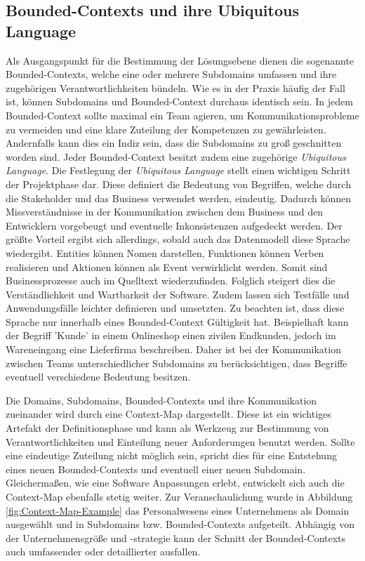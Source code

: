 \subsection{Bounded-Contexts und ihre Ubiquitous Language}

Als Ausgangspunkt für die Bestimmung der Lösungsebene dienen die sogenannte Bounded-Contexts, welche eine oder mehrere Subdomains umfassen und ihre zugehörigen Verantwortlichkeiten bündeln. Wie es in der Praxis häufig der Fall ist, können Subdomains und Bounded-Context durchaus identisch sein. In jedem Bounded-Context sollte maximal ein Team agieren, um Kommunikationsprobleme zu vermeiden und eine klare Zuteilung der Kompetenzen zu gewährleisten. Andernfalls kann dies ein Indiz sein, dass die Subdomains zu groß geschnitten worden sind. Jeder Bounded-Context besitzt zudem eine zugehörige \emph{Ubiquitous Language}. Die Festlegung der \emph{Ubiquitous Language} stellt einen wichtigen Schritt der Projektphase dar. Diese definiert die Bedeutung von Begriffen, welche durch die Stakeholder und das Business verwendet werden, eindeutig. Dadurch können Missverständnisse in der Kommunikation zwischen dem Business und den Entwicklern vorgebeugt und eventuelle Inkonsistenzen aufgedeckt werden. Der größte Vorteil ergibt sich allerdings, sobald auch das Datenmodell diese Sprache wiedergibt. Entities können Nomen darstellen, Funktionen können Verben realisieren und Aktionen können als Event verwirklicht werden. Somit sind Businessprozesse auch im Quelltext wiederzufinden. Folglich steigert dies die Verständlichkeit und Wartbarkeit der Software. Zudem lassen sich Testfälle und Anwendungsfälle leichter definieren und umsetzten. Zu beachten ist, dass diese Sprache nur innerhalb eines Bounded-Context Gültigkeit hat. Beispielhaft kann der Begriff 'Kunde' in einem Onlineshop einen zivilen Endkunden, jedoch im Wareneingang eine Lieferfirma beschreiben. Daher ist bei der Kommunikation zwischen Teams unterschiedlicher Subdomains zu berücksichtigen, dass Begriffe eventuell verschiedene Bedeutung besitzen. 

Die Domains, Subdomains, Bounded-Contexts und ihre Kommunikation zueinander wird durch eine Context-Map dargestellt. Diese ist ein wichtiges Artefakt der Definitionsphase und kann als Werkzeug zur Bestimmung von Verantwortlichkeiten und Einteilung neuer Anforderungen benutzt werden. Sollte eine eindeutige Zuteilung nicht möglich sein, spricht dies für eine Entstehung eines neuen Bounded-Contexts und eventuell einer neuen Subdomain. Gleichermaßen, wie eine Software Anpassungen erlebt, entwickelt sich auch die Context-Map ebenfalls stetig weiter. Zur Veranschaulichung wurde in Abbildung \ref{fig:Context-Map-Example} das Personalwesens eines Unternehmens als Domain ausgewählt und in Subdomains bzw. Bounded-Contexts aufgeteilt. Abhängig von der Unternehmensgröße und -strategie kann der Schnitt der Bounded-Contexts auch umfassender oder detaillierter ausfallen.


